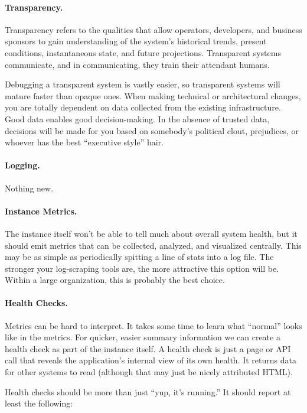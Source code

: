 \paragraph{Transparency.} Transparency refers to the qualities that allow operators, developers, and business sponsors to gain understanding of the system’s historical trends, present conditions, instantaneous state, and future projections. Transparent systems communicate, and in communicating, they train their attendant humans.

Debugging a transparent system is vastly easier, so transparent systems will mature faster than opaque ones. When making technical or architectural changes, you are totally dependent on data collected from the existing infrastructure. Good data enables good decision-making. In the absence of trusted data, decisions will be made for you based on somebody’s political clout, prejudices, or whoever has the best “executive style” hair.


\paragraph{Logging.} Nothing new.

\paragraph{Instance Metrics.} The instance itself won’t be able to tell much about overall system health, but it should emit metrics that can be collected, analyzed, and visualized centrally. This may be as simple as periodically spitting a line of stats into a log file. The stronger your log-scraping tools are, the more attractive this option will be. Within a large organization, this is probably the best choice.

\paragraph{Health Checks.} Metrics can be hard to interpret. It takes some time to learn what “normal” looks like in the metrics. For quicker, easier summary information we can create a health check as part of the instance itself. A health check is just a page or API call that reveals the application’s internal view of its own health. It returns data for other systems to read (although that may just be nicely attributed HTML).

Health checks should be more than just “yup, it’s running.” It should report at least the following:

